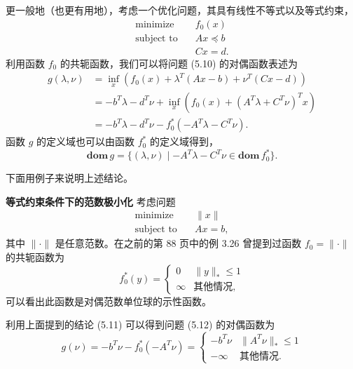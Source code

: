 \documentclass[UTF8,12pt,a4paper,fontset=fandol]{ctexart}
\begin{document}
更一般地（也更有用地），考虑一个优化问题，其具有线性不等式以及等式约束，
\begin{equation}
\begin{aligned}
\text{minimize}\quad & f_0(x)\\
\text{subject to}\quad & Ax\preceq b\\
& Cx=d.
\end{aligned}
\tag{5.10}
\end{equation}
利用函数 $f_0$ 的共轭函数，我们可以将问题 (5.10) 的对偶函数表述为
\begin{equation}
\begin{aligned}
g(\lambda,\nu)
&=\inf_x\left(f_0(x)+\lambda^T(Ax-b)+\nu^T(Cx-d)\right)\\
&=-b^T\lambda-d^T\nu+\inf_x\left(f_0(x)+(A^T\lambda+C^T\nu)^Tx\right)\\
&=-b^T\lambda-d^T\nu-f_0^\ast(-A^T\lambda-C^T\nu).
\end{aligned}
\tag{5.11}
\end{equation}
函数 $g$ 的定义域也可以由函数 $f_0^\ast$ 的定义域得到，
\[
\mathbf{dom}\,g=\{(\lambda,\nu)\mid -A^T\lambda-C^T\nu\in\mathbf{dom}\,f_0^\ast\}.
\]

下面用例子来说明上述结论。

\noindent\textbf{等式约束条件下的范数极小化}\quad
考虑问题
\begin{equation}
\begin{aligned}
\text{minimize}\quad & \|x\|\\
\text{subject to}\quad & Ax=b,
\end{aligned}
\tag{5.12}
\end{equation}
其中 $\|\cdot\|$ 是任意范数。在之前的第 88 页中的例 3.26 曾提到过函数 $f_0=\|\cdot\|$ 的共轭函数为
\[
f_0^\ast(y)=
\begin{cases}
0 & \|y\|_\ast\leq 1\\
\infty & \text{其他情况},
\end{cases}
\]
可以看出此函数是对偶范数单位球的示性函数。

利用上面提到的结论 (5.11) 可以得到问题 (5.12) 的对偶函数为
\[
g(\nu)=-b^T\nu-f_0^\ast(-A^T\nu)
=
\begin{cases}
-b^T\nu & \|A^T\nu\|_\ast\leq 1\\
-\infty & \text{其他情况}.
\end{cases}
\]
\end{document}
